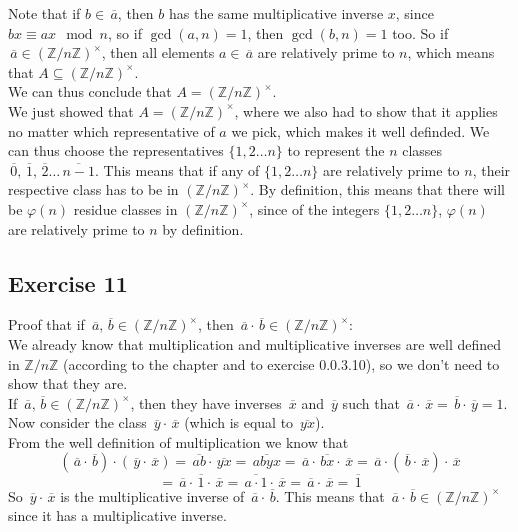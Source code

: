 \documentclass[12pt]{article}
\newcommand{\Z}{\mathbb{Z}}
\newcommand{\olsi}[1]{\,\overline{{#1}}}
\begin{document}
    Note that if $b \in \olsi{a}$,
    then $b$ has the same multiplicative inverse $x$,
    since $bx \equiv ax \mod n$,
    so if $\gcd(a, n) = 1$, then $\gcd(b, n) = 1$ too.
    So if $\olsi{a} \in (\Z/n\Z)^\times$,
    then all elements $a \in \olsi{a}$
    are relatively prime to $n$,
    which means that $A \subseteq (\Z/n\Z)^\times$. \\
    We can thus conclude that $A = (\Z/n\Z)^\times$. \\
    We just showed that $A = (\Z/n\Z)^\times$,
    where we also had to show that it applies
    no matter which representative of $a$ we pick,
    which makes it well definded.
    We can thus choose the representatives
    $\{1, 2 \dots n \}$
    to represent
    the $n$ classes $\olsi{0}, \olsi{1}, \olsi{2} \dots \olsi{n-1}$.
    This means that if any of $\{1, 2 \dots n \}$
    are relatively prime to $n$,
    their respective class has to be in $(\Z/n\Z)^\times$.
    By definition,
    this means that there will be $\varphi(n)$
    residue classes in $(\Z/n\Z)^\times$,
    since of the integers $\{1, 2 \dots n \}$,
    $\varphi(n)$ are relatively prime to $n$ by definition. \\

    \subsection*{Exercise 11}
    Proof that if $\olsi{a}, \olsi{b} \in (\Z/n\Z)^\times$,
    then $\olsi{a} \cdot \olsi{b} \in (\Z/n\Z)^\times$: \\
    We already know that multiplication
    and multiplicative inverses are well defined in $\Z/n\Z$
    (according to the chapter and to exercise 0.0.3.10),
    so we don't need to show that they are. \\
    If $\olsi{a}, \olsi{b} \in (\Z/n\Z)^\times$,
    then they have inverses $\olsi{x}$ and $\olsi{y}$
    such that $\olsi{a} \cdot \olsi{x} = \olsi{b} \cdot \olsi{y} = 1$.
    Now consider the class $\olsi{y} \cdot \olsi{x}$
    (which is equal to $\olsi{yx}$). \\
    From the well definition of multiplication we know that
    \[ (\olsi{a} \cdot \olsi{b}) \cdot (\olsi{y} \cdot \olsi{x})
    = \olsi{ab} \cdot \olsi{yx}
    = \olsi{abyx}
    = \olsi{a} \cdot \olsi{bx} \cdot \olsi{x}
    = \olsi{a} \cdot (\olsi{b} \cdot \olsi{x}) \cdot \olsi{x} \]
    \[ = \olsi{a} \cdot \olsi{1} \cdot \olsi{x}
    = \olsi{a \cdot 1} \cdot \olsi{x}
    = \olsi{a} \cdot \olsi{x}
    = \olsi{1} \]
    So $\olsi{y} \cdot \olsi{x}$
    is the multiplicative inverse of $\olsi{a} \cdot \olsi{b}$.
    This means that $\olsi{a} \cdot \olsi{b} \in (\Z/n\Z)^\times$
    since it has a multiplicative inverse. \\
\end{document}
